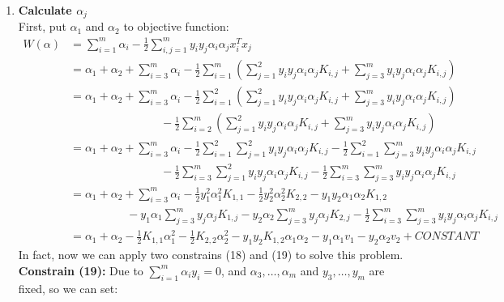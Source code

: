 \documentclass[a4paper]{article}
\begin{document}
\begin{enumerate}
\item{ \textbf{Calculate $\alpha_j$} \\
First, put $\alpha_1$ and $\alpha_2$ to objective function: \\
\begin{align*}
W(\alpha) &= \sum_{i=1}^{m} \alpha_i - \frac{1}{2} \sum_{i,j=1}^{m} y_i y_j \alpha_i \alpha_j x_i^T x_j \\
		&= \alpha_1 + \alpha_2 + \sum_{i=3}^{m} \alpha_i - \frac{1}{2} \sum_{i=1}^{m} (\sum_{j=1}^{2} y_i y_j \alpha_i \alpha_j K_{i,j} + \sum_{j=3}^{m} y_i y_j \alpha_i \alpha_j K_{i,j})  \\
		&= \alpha_1 + \alpha_2 + \sum_{i=3}^{m} \alpha_i - \frac{1}{2} \sum_{i=1}^{2} (\sum_{j=1}^{2} y_i y_j \alpha_i \alpha_j K_{i,j} + \sum_{j=3}^{m} y_i y_j \alpha_i \alpha_j K_{i,j})  \\ & \quad   \quad  \quad \quad  \quad  \quad \quad \quad - \frac{1}{2} \sum_{i=2}^{m} (\sum_{j=1}^{2} y_i y_j \alpha_i \alpha_j K_{i,j} + \sum_{j=3}^{m} y_i y_j \alpha_i \alpha_j K_{i,j})  \\
		&= \alpha_1 + \alpha_2 + \sum_{i=3}^{m} \alpha_i - \frac{1}{2} \sum_{i=1}^{2} \sum_{j=1}^{2} y_i y_j \alpha_i \alpha_j K_{i,j} - \frac{1}{2} \sum_{i=1}^{2} \sum_{j=3}^{m} y_i y_j \alpha_i \alpha_j K_{i,j}  \\ 
		&  \quad   \quad  \quad \quad  \quad  \quad \quad \quad - \frac{1}{2} \sum_{i=3}^{m} \sum_{j=1}^{2} y_i y_j \alpha_i \alpha_j K_{i,j}  - \frac{1}{2} \sum_{i=3}^{m} \sum_{j=3}^{m} y_i y_j \alpha_i \alpha_j K_{i,j} \\
		&=  \alpha_1 + \alpha_2 + \sum_{i=3}^{m} \alpha_i - \frac{1}{2} y_1^2 \alpha_1^2 K_{1,1} - \frac{1}{2} y_2^2 \alpha_2^2 K_{2,2} - y_1 y_2 \alpha_1 \alpha_2 K_{1,2} \\ 
		&\quad   \quad  \quad \quad  \quad - y_1\alpha_1 \sum_{j=3}^{m} y_j \alpha_j K_{1,j} - y_2 \alpha_2 \sum_{j=3}^{m} y_j \alpha_j K_{2,j} - \frac{1}{2} \sum_{i=3}^{m} \sum_{j=3}^{m} y_i y_j \alpha_i \alpha_j K_{i,j} \\
		&= \alpha_1 + \alpha_2 -\frac{1}{2}K_{1,1}\alpha_1^2 - \frac{1}{2}K_{2,2}\alpha_2^2 - y_1 y_2 K_{1,2} \alpha_1 \alpha_2 - y_1 \alpha_1 v_1 - y_2 \alpha_2 v_2 + CONSTANT
\end{align*}
In fact, now we can apply two constrains (18) and (19) to solve this problem. \\
\textbf{Constrain (19):} Due to $\sum_{i=1}^{m} \alpha_i y_i = 0$, and $\alpha_3, \dots, \alpha_m$ and $y_3, \dots, y_m$ are fixed, so we can set:
}
\end{enumerate}
\end{document}
